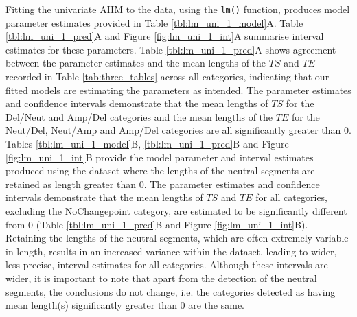 Fitting the univariate AIIM to the data, using the \texttt{lm()} function, produces model parameter estimates provided in Table \ref{tbl:lm_uni_1_model}A. Table \ref{tbl:lm_uni_1_pred}A and Figure \ref{fig:lm_uni_1_int}A summarise interval estimates for these parameters. Table \ref{tbl:lm_uni_1_pred}A shows agreement between the parameter estimates and the mean lengths of the $TS$ and $TE$ recorded in Table \ref{tab:three_tables} across all categories, indicating that our fitted models are estimating the parameters as intended. The parameter estimates and confidence intervals demonstrate that the mean lengths of $TS$ for the Del/Neut and Amp/Del categories and the mean lengths of the $TE$ for the Neut/Del, Neut/Amp and Amp/Del categories are all significantly greater than 0. Tables \ref{tbl:lm_uni_1_model}B, \ref{tbl:lm_uni_1_pred}B and Figure \ref{fig:lm_uni_1_int}B provide the model parameter and interval estimates produced using the dataset where the lengths of the neutral segments are retained as length greater than 0. The parameter estimates and confidence intervals demonstrate that the mean lengths of $TS$ and $TE$ for all categories, excluding the NoChangepoint category, are estimated to be significantly different from 0 (Table \ref{tbl:lm_uni_1_pred}B and Figure \ref{fig:lm_uni_1_int}B). Retaining the lengths of the neutral segments, which are often extremely variable in length, results in an increased variance within the dataset, leading to wider, less precise, interval estimates for all categories. Although these intervals are wider, it is important to note that apart from the detection of the neutral segments, the conclusions do not change, i.e. the categories detected as having mean length(s) significantly greater than 0 are the same. 

